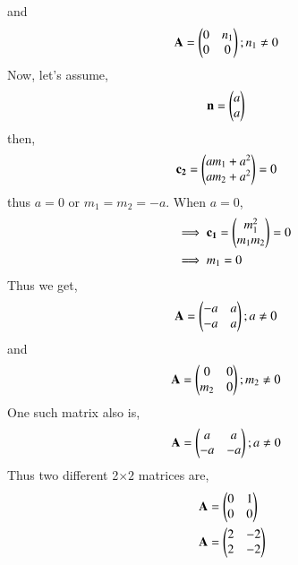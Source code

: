 \documentclass[journal,12pt,twocolumn]{IEEEtran}
\begin{document}
and
\begin{align}
    \mathbf{A} &= \begin{pmatrix}0&n_1\\0&0\end{pmatrix} ; n_1\ne0
\end{align}
Now, let's assume, 
\begin{align}
    \mathbf{n} &= \begin{pmatrix}a\\a\end{pmatrix}
\end{align}
then, 
\begin{align}
    \mathbf{c_2} &= \begin{pmatrix}am_1+a^2\\am_2+a^2\end{pmatrix} = 0
\end{align}
thus $a=0$ or $m_1=m_2=-a$. When $a=0$, 
\begin{align}
    &\implies\mathbf{c_1} = \begin{pmatrix}m_1^2\\m_1m_2\end{pmatrix}=0\\
    &\implies m_1=0
\end{align}
Thus we get, 
\begin{align}
    \mathbf{A} &= \begin{pmatrix}-a&a\\-a&a\end{pmatrix} ; a\ne0
\end{align}
and 
\begin{align}
    \mathbf{A} &= \begin{pmatrix}0&0\\m_2&0\end{pmatrix} ; m_2\ne0
\end{align}
One such matrix also is, 
\begin{align}
    \mathbf{A} &= \begin{pmatrix}a&a\\-a&-a\end{pmatrix} ; a\ne0
\end{align}
Thus two different 2$\times2$ matrices are, 
\begin{align}
    \mathbf{A}&=\begin{pmatrix}0&1\\0&0\end{pmatrix}\\
    \mathbf{A}&=\begin{pmatrix}2&-2\\2&-2\end{pmatrix}
\end{align}
\end{document}
